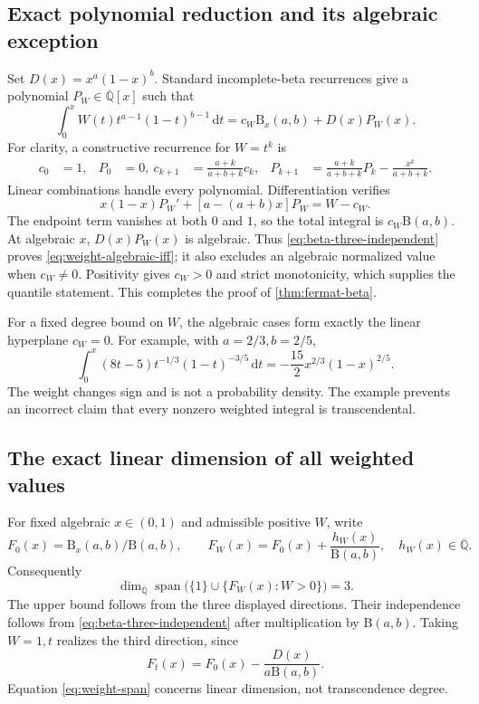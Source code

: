 \documentclass[11pt,a4paper]{article}
\numberwithin{equation}{section}
\theoremstyle{definition}
\theoremstyle{remark}
\newcommand{\Qb}{\overline{\mathbb Q}}
\newcommand{\B}{\mathrm B}
\newcommand{\Span}{\operatorname{span}}
\newcommand{\dd}{\,\mathrm d}
\begin{document}
\subsection{Exact polynomial reduction and its algebraic exception}
Set $D(x)=x^a(1-x)^b$. Standard incomplete-beta recurrences
\cite{DLMF} give a polynomial $P_W\in\Qb[x]$ such that
\begin{equation}\label{eq:weighted-beta-reduction}
 \int_0^xW(t)t^{a-1}(1-t)^{b-1}\dd t
 =c_W\B_x(a,b)+D(x)P_W(x).
\end{equation}
For clarity, a constructive recurrence for $W=t^k$ is
\begin{align}
 c_0&=1,&P_0&=0,\
 c_{k+1}&=\frac{a+k}{a+b+k}c_k,
 &P_{k+1}&=\frac{a+k}{a+b+k}P_k-\frac{x^k}{a+b+k}.
\end{align}
Linear combinations handle every polynomial. Differentiation verifies
\begin{equation}\label{eq:weight-differential}
 x(1-x)P_W'+[a-(a+b)x]P_W=W-c_W.
\end{equation}
The endpoint term vanishes at both $0$ and $1$, so the total integral is
$c_W\B(a,b)$. At algebraic $x$, $D(x)P_W(x)$ is algebraic. Thus
\eqref{eq:beta-three-independent} proves
\eqref{eq:weight-algebraic-iff}; it also excludes an algebraic normalized
value when $c_W\ne0$. Positivity gives $c_W>0$ and strict monotonicity,
which supplies the quantile statement. This completes the proof of
\cref{thm:fermat-beta}.

For a fixed degree bound on $W$, the algebraic cases form exactly the
linear hyperplane $c_W=0$. For example, with $a=2/3,b=2/5$,
\begin{equation}\label{eq:signed-beta-exact}
 \int_0^x(8t-5)t^{-1/3}(1-t)^{-3/5}\dd t
 =-\frac{15}{2}x^{2/3}(1-x)^{2/5}.
\end{equation}
The weight changes sign and is not a probability density. The example
prevents an incorrect claim that every nonzero weighted integral is
transcendental.

\subsection{The exact linear dimension of all weighted values}
For fixed algebraic $x\in(0,1)$ and admissible positive $W$, write
\[
 F_0(x)=\B_x(a,b)/\B(a,b),\qquad
 F_W(x)=F_0(x)+\frac{h_W(x)}{\B(a,b)},\quad h_W(x)\in\Qb.
\]
Consequently
\begin{equation}\label{eq:weight-span}
 \dim_{\Qb}\Span\bigl(\{1\}\cup\{F_W(x):W>0\}\bigr)=3.
\end{equation}
The upper bound follows from the three displayed directions. Their
independence follows from \eqref{eq:beta-three-independent} after
multiplication by $\B(a,b)$. Taking $W=1,t$ realizes the third direction,
since
\[
 F_t(x)=F_0(x)-\frac{D(x)}{a\B(a,b)}.
\]
Equation \eqref{eq:weight-span} concerns linear dimension, not
transcendence degree.
\end{document}
